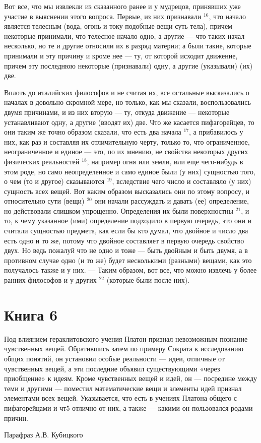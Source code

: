 \documentclass[oneside, 17pt, dvipsnames]{extbook}
\begin{document}
Вот все, что мы извлекли из сказанного ранее и у мудрецов, принявших уже участие в выяснении этого вопроса. Первые, из них признавали $^{16}$, что начало является телесным (вода, огонь и току подобные вещи суть тела), причем некоторые принимали, что телесное начало одно, а другие — что таких начал несколько, но те и другие относили их в разряд материи; а были такие, которые принимали и эту причину и кроме нее — ту, от которой исходит движение, причем эту последнюю некоторые (признавали) одну, а другие (указывали) (их) две.

Вплоть до италийских философов и не считая их, все остальные высказались о началах в довольно скромной мере, но только, как мы сказали, воспользовались двумя причинами, и из них вторую — ту, откуда движение — некоторые устанавливают одну, а другие (вводят их) две. Что же касается пифагорейцев, то они таким же точно образом сказали, что есть два начала $^{17}$, а прибавилось у них, как раз и составляя их отличительную черту, только то, что ограниченное, неограниченное и единое — это, по их мнению, не свойства некоторых других физических реальностей $^{18}$, например огня или земли, или еще чего-нибудь в этом роде, но само неопределенное и само единое были (у них) сущностью того, о чем (то и другое) сказываются $^{19}$, вследствие чего число и составляло (у них) сущность всех вещей. Вот каким образом высказались они по этому вопросу, и относительно сути (вещи) $^{20}$ они начали рассуждать и давать (ее) определение, но действовали слишком упрощенно. Определения их были поверхностны $^{21}$, и то, к чему указанное (ими) определение подходило в первую очередь, это они и считали сущностью предмета, как если бы кто думал, что двойное и число два есть одно и то же, потому что двойное составляет в первую очередь свойство двух. Но ведь пожалуй что не одно и тоже — быть двойным и быть двумя, а в противном случае одно (и то же) будет несколькими (разными) вещами, как это получалось также и у них. — Таким образом, вот все, что можно извлечь у более ранних философов и у других $^{22}$ (которые были после них).






\newpage
\section{Книга 6}

\epigraph{
Под влиянием гераклитовского учения Платон признал невозможным познание чувственных вещей. Обратившись затем по примеру Сократа к исследованию общих понятий, он установил особые реальности --- идеи, отличные от чувственных вещей, а эти последние объявил существующими «через приобщение» к идеям. Кроме чувственных вещей и идей, он --- посредине между теми и другими --- поместил математические вещи и элементы идей признал элементами всех вещей. Указывается, что есть в учениях Платона общего с пифагорейцами и чт5 отлично от них, а также --- какими он пользовался родами причин.
}{Парафраз А.В. Кубицкого}
\end{document}
